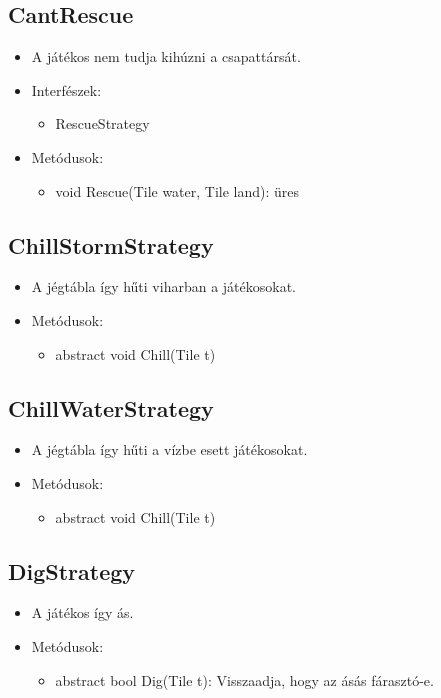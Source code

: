 \subsection{CantRescue}
\begin{itemize}
	\item A játékos nem tudja kihúzni a csapattársát.	
	\item Interfészek:
	\begin{itemize}
		\item RescueStrategy
	\end{itemize}
	\item Metódusok:
	\begin{itemize}
		\item void Rescue(Tile water, Tile land): üres
	\end{itemize}
\end{itemize}

\subsection{ChillStormStrategy}
\begin{itemize}
	\item A jégtábla így hűti viharban a játékosokat.
	\item Metódusok:
	\begin{itemize}
		\item abstract void Chill(Tile t)
	\end{itemize}
\end{itemize}

\subsection{ChillWaterStrategy}
\begin{itemize}
	\item A jégtábla így hűti a vízbe esett játékosokat.	
	\item Metódusok:
	\begin{itemize}
		\item abstract void Chill(Tile t)
	\end{itemize}
\end{itemize}

\subsection{DigStrategy}
\begin{itemize}
	\item A játékos így ás.	
	\item Metódusok:
	\begin{itemize}
		\item abstract bool Dig(Tile t): Visszaadja, hogy az ásás fárasztó-e.
	\end{itemize}
\end{itemize}

